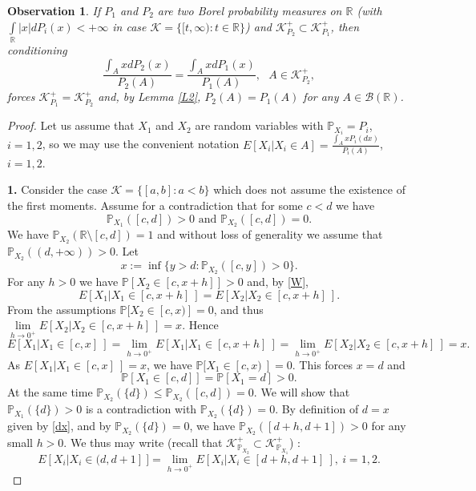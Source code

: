 \documentclass[sn-mathphys,Numbered,11pt]{sn-jnl}%
\theoremstyle{thmstyleone}%
\newtheorem{observation}[theorem]{Observation}%
\newcommand{\R}{\mathbb{R}}
\newcommand{\PP}{\mathbb{P}}
\newcommand{\B}{\mathcal{B}(\R)}
\newcommand{\KK}{\mathcal{K}}
\begin{document}
\begin{observation}\label{OL2}
   If $P_1$ and $P_2$ are two Borel probability measures on $\R$ (with\\ $\int\limits_{\R}|x|dP_i(x)<+\infty$ in case $\KK=\{[t,\infty)\colon t\in\R\}$) and $\KK^+_{P_2}\subset \KK^+_{P_1}$, then conditioning 
\begin{equation}\label{W}\frac{\int_A xdP_2(x)}{P_2(A)}=\frac{\int_A xdP_1(x)}{P_1(A)}, \ \ \ A\in \KK^+_{P_2},\end{equation}
forces $\KK^+_{P_1}=\KK^+_{P_2}$ and, by Lemma \ref{L2}, $P_2(A)=P_1(A)$ for any $A\in\B$.
\end{observation}
\begin{proof}
Let us assume that $X_1$ and $X_2$ are random variables with $\PP_{X_i}=P_i$, $i=1,2$, so we may use the convenient notation $E[X_i|X_i\in A]=\frac{\int_A x P_{i}(dx)}{P_i(A)}$, $i=1,2$. 

  \textbf{1.} Consider the case $\KK=\{[a,b]\colon a<b\}$ which does not assume the existence of the first moments. Assume for a contradiction that for some $c<d$ we have 
	$$\PP_{X_1}([c,d])>0 \mbox{ and }\PP_{X_2}([c,d])=0.$$    We have $\PP_{X_2}(\R\setminus[c,d])=1$ and without loss of generality we assume that $\PP_{X_2}((d,+\infty))>0$. Let 
\begin{equation}\label{dx}x:=\inf\{y>d\colon \PP_{X_2}([c,y])>0\}.\end{equation}
For any $h>0$ we have $\PP[X_2\in [c,x+h]]>0$ and, by \eqref{W},
$$E[X_1|X_1\in [c,x+h]\ ]=E[X_2|X_2\in [c,x+h]\ ].$$
From the assumptions  $\PP[X_2\in[c,x)]=0$, and thus $\lim\limits_{h\to0^+}E[X_2| X_2\in[c,x+h]\ ]=x$. Hence
$$E[X_1|X_1\in [c,x]\ ]=\lim\limits_{h\to0^+}E[X_1| X_1\in[c,x+h]\ ]=\lim\limits_{h\to0^+}E[X_2| X_2\in[c,x+h]\ ]=x.$$
As $E[X_1|X_1\in [c,x]\ ]=x$, we have $\PP[X_1\in[c,x)\ ]=0$. This forces $x=d$ and 
$$\PP[X_1\in [c,d]]=\PP[X_1=d]>0.$$ 
 At the same time $\PP_{X_2}(\{d\})\leq\PP_{X_2}([c,d])=0$. We will show  that  $\PP_{X_1}(\{d\})>0$ is a contradiction with $\PP_{X_2}(\{d\})=0$. By definition of $d=x$ given by \eqref{dx}, and by $\PP_{X_2}(\{d\})=0$, we have $\PP_{X_2}([d+h,d+1])>0$ for any small $h>0$. We thus may write (recall that $\KK^+_{\PP_{X_2}}\subset \KK^+_{\PP_{X_1}}$) :
$$E[X_i|X_i\in (d,d+1]\ ]=\lim\limits_{h\to0^+}E[X_i|X_i\in [d+h,d+1]\ ],\ i=1,2.$$


\end{proof}
\end{document}
